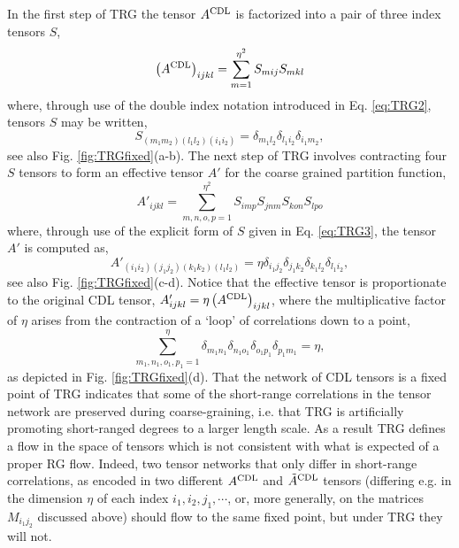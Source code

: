 \documentclass[aps,prl,twocolumn,showpacs,superscriptaddress,floatfix,10pt]{revtex4-1}
\def\CDL{\mbox{\scriptsize CDL}}
\begin{document}
In the first step of TRG the tensor $A^{\CDL}$ is factorized into a pair of three index tensors $S$,
\begin{equation} \label{eq:TRG2}
\left( A^{\CDL} \right)_{ijkl} = \sum\limits_{m = 1}^{\eta^2} {{S_{mij}}{S_{mkl}}}
\end{equation} 
where, through use of the double index notation introduced in Eq. \ref{eq:TRG2}, tensors $S$ may be written,
\begin{equation} \label{eq:TRG3}
{S_{({m_1}{m_2})({l_1}{l_2})({i_1}{i_2})}} = {\delta _{{m_1}{l_2}}}{\delta _{{l_1}{i_2}}}{\delta _{{i_1}{m_2}}},
\end{equation} 
see also Fig. \ref{fig:TRGfixed}(a-b). The next step of TRG involves contracting four $S$ tensors to form an effective tensor $A'$ for the coarse grained partition function,
\begin{equation} \label{eq:TRG4}
{{A'}_{ijkl}} = \sum\limits_{m,n,o,p = 1}^{\eta^2} {{S_{imp}}{S_{jnm}}{S_{kon}}{S_{lpo}}}
\end{equation} 
where, through use of the explicit form of $S$ given in Eq. \ref{eq:TRG3}, the tensor $A'$ is computed as,
\begin{equation} \label{eq:TRG5}
{{A'}_{({i_1}{i_2})({j_1}{j_2})({k_1}{k_2})({l_1}{l_2})}} = \eta {\delta _{{i_1}{j_2}}}{\delta _{{j_1}{k_2}}}{\delta _{{k_1}{l_2}}}{\delta _{{l_1}{i_2}}},
\end{equation}
see also Fig. \ref{fig:TRGfixed}(c-d). Notice that the effective tensor is proportionate to the original CDL tensor, $A'_{ijkl}=\eta \left( A^{\CDL} \right)_{ijkl}$, where the multiplicative factor of $\eta$ arises from the contraction of a `loop' of correlations down to a point,
\begin{equation} \label{eq:TRG6}
\sum\limits_{{m_1},{n_1},{o_1},{p_1} = 1}^{\eta} {{\delta _{{m_1}{n_1}}}{\delta _{{n_1}{o_1}}}{\delta _{{o_1}{p_1}}}{\delta _{{p_1}{m_1}}}}  = \eta,
\end{equation}
as depicted in Fig. \ref{fig:TRGfixed}(d). That the network of CDL tensors is a fixed point of TRG indicates that some of the short-range correlations in the tensor network are preserved during coarse-graining, i.e. that TRG is artificially promoting short-ranged degrees to a larger length scale. As a result TRG defines a flow in the space of tensors which is not consistent with what is expected of a proper RG flow. Indeed, two tensor networks that only differ in short-range correlations, as encoded in two different $A^{\CDL}$ and $\tilde{A}^{\CDL}$ tensors (differing e.g. in the dimension $\eta$ of each index $i_1, i_2, j_1, \cdots$, or, more generally, on the matrices $M_{i_1 j_2}$ discussed above) should flow to the same fixed point, but under TRG they will not.
\end{document}
